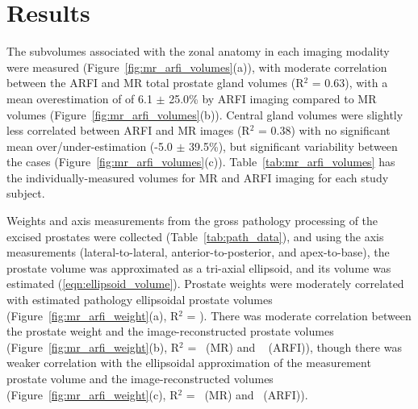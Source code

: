 \section{Results}\label{sect:results}
The subvolumes associated with the zonal anatomy in each imaging modality were
measured (Figure~\ref{fig:mr_arfi_volumes}(a)), with moderate correlation
between the ARFI and MR total prostate gland volumes (R$^2$ = 0.63), with a
mean overestimation of of 6.1 $\pm$ 25.0\% by ARFI imaging compared to MR
volumes (Figure~\ref{fig:mr_arfi_volumes}(b)).  Central gland volumes were
slightly less correlated between ARFI and MR images (R$^2$ = 0.38) with no
significant mean over/under-estimation (-5.0 $\pm$ 39.5\%), but significant
variability between the cases (Figure~\ref{fig:mr_arfi_volumes}(c)).
Table~\ref{tab:mr_arfi_volumes} has the individually-measured volumes for MR
and ARFI imaging for each study subject.



Weights and axis measurements from the gross pathology processing of the
excised prostates were collected (Table~\ref{tab:path_data}), and using the
axis measurements (lateral-to-lateral, anterior-to-posterior, and
apex-to-base), the prostate volume was approximated as a tri-axial ellipsoid,
and its volume was estimated (\ref{eqn:ellipsoid_volume}).  Prostate weights
were moderately correlated with estimated pathology ellipsoidal prostate
volumes (Figure~\ref{fig:mr_arfi_weight}(a), R$^2$ = \pathVolWeightRsq).  There
was moderate correlation between the prostate weight and the
image-reconstructed prostate volumes (Figure~\ref{fig:mr_arfi_weight}(b), R$^2$
= \weightMRrsq~(MR) and \weightARFIrsq~ (ARFI)), though there was weaker
correlation with the ellipsoidal approximation of the measurement prostate
volume and the image-reconstructed volumes (Figure~\ref{fig:mr_arfi_weight}(c),
R$^2$ = \pathVolMRrsq~(MR) and \pathVolARFIrsq~(ARFI)).  



